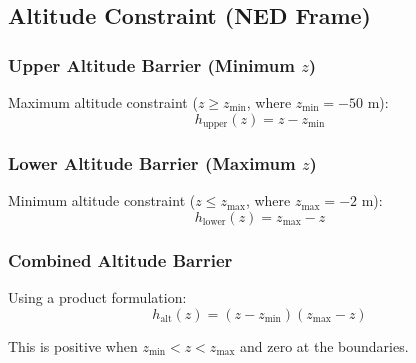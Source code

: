 \subsection{Altitude Constraint (NED Frame)}


\subsubsection{Upper Altitude Barrier (Minimum $z$)}

Maximum altitude constraint ($z \geq z_{\min}$, where $z_{\min} = -50$ m):
\begin{equation}
    h_{\text{upper}}(z) = z - z_{\min}
\end{equation}

\subsubsection{Lower Altitude Barrier (Maximum $z$)}

Minimum altitude constraint ($z \leq z_{\max}$, where $z_{\max} = -2$ m):
\begin{equation}
    h_{\text{lower}}(z) = z_{\max} - z
\end{equation}

\subsubsection{Combined Altitude Barrier}

Using a product formulation:
\begin{equation}
    h_{\text{alt}}(z) = (z - z_{\min})(z_{\max} - z)
\end{equation}

This is positive when $z_{\min} < z < z_{\max}$ and zero at the boundaries.

